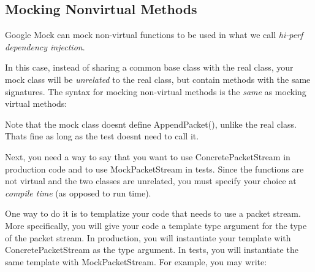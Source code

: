 \subsection*{Mocking Nonvirtual Methods}

Google Mock can mock non-\/virtual functions to be used in what we call {\itshape hi-\/perf dependency injection}.

In this case, instead of sharing a common base class with the real class, your mock class will be {\itshape unrelated} to the real class, but contain methods with the same signatures. The syntax for mocking non-\/virtual methods is the {\itshape same} as mocking virtual methods\+:


\begin{DoxyCode}{0}
\DoxyCodeLine{\};}
\DoxyCodeLine{}
\DoxyCodeLine{\};}
\end{DoxyCode}


Note that the mock class doesn\textquotesingle{}t define {\ttfamily Append\+Packet()}, unlike the real class. That\textquotesingle{}s fine as long as the test doesn\textquotesingle{}t need to call it.

Next, you need a way to say that you want to use {\ttfamily Concrete\+Packet\+Stream} in production code and to use {\ttfamily Mock\+Packet\+Stream} in tests. Since the functions are not virtual and the two classes are unrelated, you must specify your choice at {\itshape compile time} (as opposed to run time).

One way to do it is to templatize your code that needs to use a packet stream. More specifically, you will give your code a template type argument for the type of the packet stream. In production, you will instantiate your template with {\ttfamily Concrete\+Packet\+Stream} as the type argument. In tests, you will instantiate the same template with {\ttfamily Mock\+Packet\+Stream}. For example, you may write\+:


